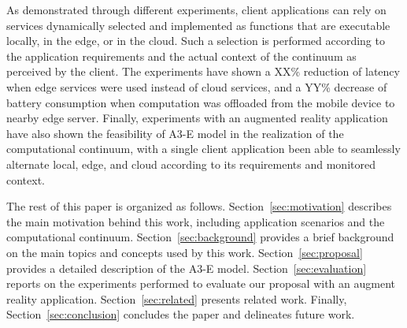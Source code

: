 As demonstrated through different experiments, client applications can rely on services dynamically selected and implemented as functions that are executable locally, in the edge, or in the cloud. Such a selection is performed according to the application requirements and the actual context of the continuum as perceived by the client. The experiments have shown a XX\% reduction of latency when edge services were used instead of cloud services, and a YY\% decrease of battery consumption when computation was offloaded from the mobile device to nearby edge server. Finally, experiments with an augmented reality application have also shown the feasibility of A3-E model in the realization of the computational continuum, with a single client application been able to seamlessly alternate local, edge, and cloud according to its requirements and monitored context.




The rest of this paper is organized as follows. Section~\ref{sec:motivation} describes the main motivation behind this work, including application scenarios and the computational continuum. Section~\ref{sec:background} provides a brief background on the main topics and concepts used by this work. Section~\ref{sec:proposal} provides a detailed description of the A3-E model. Section~\ref{sec:evaluation} reports on the experiments performed to evaluate our proposal with an augment reality application. Section~\ref{sec:related} presents related work. Finally, Section~\ref{sec:conclusion} concludes the paper and delineates future work.




